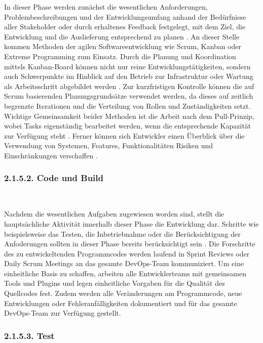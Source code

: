 In dieser Phase werden zunächst die wesentlichen Anforderungen, Problembeschreibungen und der Entwicklungsumfang anhand der Bedürfnisse aller Stakeholder oder durch erhaltenes Feedback festgelegt, mit dem Ziel, die Entwicklung und die Auslieferung entsprechend zu planen \cite[s. 16]{halstenberg_devops_2020}. An dieser Stelle kommen Methoden der agilen Softwareentwicklung wie Scrum, Kanban oder Extreme Programming zum Einsatz. Durch die Planung und Koordination mittels Kanban-Board können nicht nur reine Entwicklungstätigkeiten, sondern auch Schwerpunkte im Hinblick auf den Betrieb zur Infrastruktur oder Wartung als Arbeitsschritt abgebildet werden \cite{schaefer_devops_2017}. Zur kurzfristigen Kontrolle können die auf Scrum basierenden Planungsgrundsätze verwendet werden, da dieses auf zeitlich begrenzte Iterationen und die Verteilung von Rollen und Zuständigkeiten setzt. Wichtige Gemeinsamkeit beider Methoden ist die Arbeit nach dem Pull-Prinzip, wobei Tasks eigenständig bearbeitet werden, wenn die entsprechende Kapazität zur Verfügung steht \cite{concas_agile_2007}. Ferner können sich Entwickler einen Überblick über die Verwendung von Systemen, Features, Funktionalitäten Risiken und Einschränkungen verschaffen \cite{yarlagadda_devops_2021}. 

\subsubsection{2.1.5.2. Code und Build} $~$

Nachdem die wesentlichen Aufgaben zugewiesen worden sind, stellt die hauptsächliche Aktivität innerhalb dieser Phase die Entwicklung dar. Schritte wie beispielsweise das Testen, die Inbetriebnahme oder die Berücksichtigung der Anfoderungen sollten in dieser Phase bereits berücksichtigt sein \cite[S. 18]{halstenberg_devops_2020}. Die Forschritte des zu entwickeltenden Programmcodes werden laufend in Sprint Reviews oder Daily Scrum Meetings an das gesamte DevOps-Team kommuniziert. Um eine einheitliche Basis zu schaffen, arbeiten alle Entwicklerteams mit gemeinsamen Tools und Plugins und legen einheitliche Vorgaben für die Qualität des Quellcodes fest. Zudem werden alle Veränderungen am Programmcode, neue Entwicklungen oder Fehleranfälligkeiten dokumentiert und für das gesamte DevOps-Team zur Verfügung gestellt.

\subsubsection{2.1.5.3. Test} $~$

